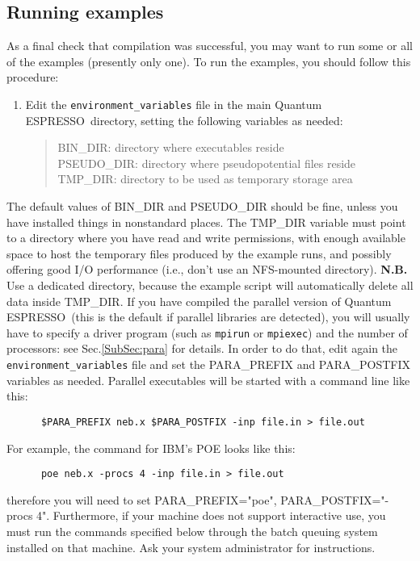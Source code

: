 \documentclass[12pt,a4paper]{article}
\def\qe{{\sc Quantum ESPRESSO}}
\begin{document}
\subsection{Running examples}
\label{SubSec:Examples}
As a final check that compilation was successful, you may want to run some or
all of the examples (presently only one). To run the examples, you should follow this procedure:
\begin{enumerate}   
\item Edit the \texttt{environment\_variables} file in the main \qe \ directory,
 setting the following variables as needed: 
\begin{quote}
   BIN\_DIR: directory where executables reside\\
   PSEUDO\_DIR: directory where pseudopotential files reside\\
   TMP\_DIR: directory to be used as temporary storage area
\end{quote}
\end{enumerate}
The default values of BIN\_DIR and PSEUDO\_DIR should be fine, 
unless you have installed things in nonstandard places. The TMP\_DIR 
variable must point to a directory where you have read and write permissions, 
with enough available space to host the temporary files produced by the 
example runs, and possibly offering good I/O performance (i.e., don't 
use an NFS-mounted directory). \textbf{N.B.} Use a dedicated directory,
because the example script will automatically delete all data inside TMP\_DIR.
If you have compiled the parallel version of \qe\ (this
is the default if parallel libraries are detected), you will usually
have to specify a driver program (such as \texttt{mpirun} or \texttt{mpiexec}) 
and the number of processors: see Sec.\ref{SubSec:para} for
details. In order to do that, edit again the \texttt{environment\_variables} 
file
and set the PARA\_PREFIX and PARA\_POSTFIX variables as needed. 
Parallel executables will be started with a command line like this: 
\begin{verbatim}
      $PARA_PREFIX neb.x $PARA_POSTFIX -inp file.in > file.out
\end{verbatim}
For example, the command for IBM's POE looks like this:
\begin{verbatim}
      poe neb.x -procs 4 -inp file.in > file.out
\end{verbatim}
therefore you will need to set PARA\_PREFIX="poe", PARA\_POSTFIX="-procs 4". 
Furthermore, if your machine does not support interactive use, you
must run the commands specified below through the batch queuing
system installed on that machine. Ask your system administrator for
instructions. 
\end{document}
